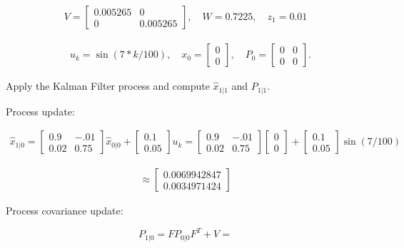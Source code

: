 \[\begin{aligned}
V = \begin{bmatrix} 0.005265&0\\0& 0.005265\end{bmatrix}, \quad W = 0.7225,\quad z_1 = 0.01
\end{aligned}\]

\[\begin{aligned}
\quad u_k = \sin (7*k/100), \quad x_0 = \begin{bmatrix} 0\\0\end{bmatrix},
\quad P_0 = \begin{bmatrix}0 & 0\\ 0&0\end{bmatrix}.
\end{aligned}\]

Apply the Kalman Filter process and compute \(\hat{x}_{1|1}\) and
\(P_{1|1}\).

Process update:

\[\begin{aligned}
\hat{x}_{1|0} = \begin{bmatrix} 0.9 &-.01 \\0.02 &0.75\end{bmatrix}\hat{x}_{0|0}
+ \begin{bmatrix} 0.1\\ 0.05\end{bmatrix} u_k
=  \begin{bmatrix} 0.9 &-.01 \\0.02 &0.75\end{bmatrix}\begin{bmatrix} 0\\0\end{bmatrix}
+ \begin{bmatrix} 0.1\\ 0.05\end{bmatrix}\sin (7/100)
\end{aligned}\]

\[\begin{aligned}
\approx \begin{bmatrix} 0.0069942847\\  0.0034971424\end{bmatrix}
\end{aligned}\]

Process covariance update:

\[P_{1|0} = F P_{0|0} F^{T} + V =\]

